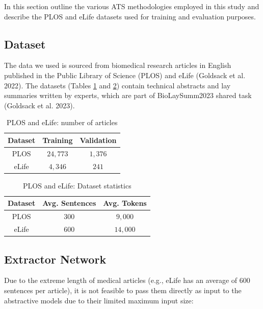 \documentclass[
]{article}
\begin{document}
In this section outline the various ATS methodologies employed in this
study and describe the PLOS and eLife datasets used for training and
evaluation purposes.

\hypertarget{sec:dataset}{%
\subsection{Dataset}\label{sec:dataset}}

The data we used is sourced from biomedical research articles in English
published in the Public Library of Science (PLOS) and eLife (Goldsack et
al. 2022). The datasets (Tables \ref{tab:dataset_stats_1} and
\ref{tab:dataset_stats_2}) contain technical abstracts and lay summaries
written by experts, which are part of BioLaySumm2023 shared task
(Goldsack et al. 2023).

\begin{table}[htbp]
    \centering
    \begin{tabular}{|c|c|c|}
        \hline
        \textbf{Dataset} & \textbf{Training} & \textbf{Validation} \\
        \hline
            PLOS & $24,773$ & $1,376$ \\
        \hline
            eLife & $4,346$ & $241$ \\
        \hline
    \end{tabular}
    \caption{PLOS and eLife: number of articles}\label{tab:dataset_stats_1}
\end{table}

\begin{table}[htbp]
    \centering
    \begin{tabular}{|c|c|c|}
        \hline
        \textbf{Dataset} & \textbf{Avg. Sentences} & \textbf{Avg. Tokens} \\
        \hline
            PLOS & $300$ & $9,000$ \\
        \hline
            eLife & $600$ & $14,000$ \\
        \hline
    \end{tabular}
    \caption{PLOS and eLife: Dataset statistics}\label{tab:dataset_stats_2}
\end{table}

\hypertarget{sec:extractor-network}{%
\subsection{Extractor Network}\label{sec:extractor-network}}

Due to the extreme length of medical articles (e.g., eLife has an
average of \(600\) sentences per article), it is not feasible to pass
them directly as input to the abstractive models due to their limited
maximum input size:
\end{document}
